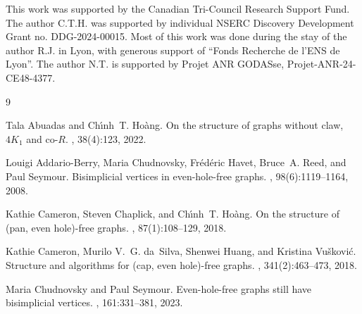 \documentclass[12pt]{article}
\begin{document}
This work was supported by the Canadian Tri-Council Research Support Fund. The author  C.T.H. was supported by individual NSERC Discovery Development Grant no. DDG-2024-00015.  
Most of this work was done during the stay of the author R.J. in Lyon, with generous support of ``Fonds Recherche de l'ENS de Lyon''. 
The author N.T. is supported by Projet ANR GODASse, Projet-ANR-24-CE48-4377.
%
\begin{thebibliography}{9}
	
	Tala Abuadas and Ch{\'{\i}}nh~T. Ho{\`{a}}ng.
	\newblock On the structure of graphs without claw, {$4K_1$ and co-$R$}.
	, 38(4):123, 2022.  
	
	Louigi Addario{-}Berry, Maria Chudnovsky, Fr{\'{e}}d{\'{e}}ric Havet, Bruce~A.
	Reed, and Paul Seymour.
	\newblock Bisimplicial vertices in even-hole-free graphs.
	, 98(6):1119--1164,
	2008.
	
	
	
	
	
	Kathie Cameron, Steven Chaplick, and Ch{\'{\i}}nh~T. Ho{\`{a}}ng.
	\newblock On the structure of (pan, even hole)-free graphs.
	, 87(1):108--129, 2018.
	
	
	Kathie Cameron, Murilo V.~G. da~Silva, Shenwei Huang, and {Kristina Vu{\v s}kovi\'c}.
	\newblock Structure and algorithms for (cap, even hole)-free graphs.
	, 341(2):463--473, 2018.
	
	Maria Chudnovsky and Paul Seymour.
	\newblock Even-hole-free graphs still have bisimplicial vertices.
	, 161:331--381,
	2023.
	
	

\end{thebibliography}
\end{document}
